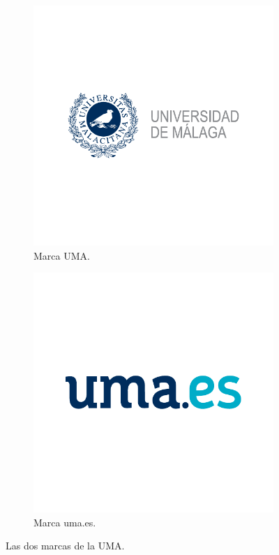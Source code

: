 	\begin{figure}[ht]
	  \centering
	  \begin{subfigure}[t]{0.4\linewidth}
	    \centering
	    \includegraphics[width=\textwidth]{figuras/MarcaUMA.pdf}
			\caption{Marca UMA.}
	    \label{fig:marcaUMA-a}
	  \end{subfigure}%
		\hfill
	  \begin{subfigure}[t]{0.4\linewidth}
	    \centering
	    \includegraphics[width=\textwidth]{figuras/marcaumaes.pdf}
	    \caption{Marca uma.es.}
	    \label{fig:marcaUMA-b}
	  \end{subfigure}
	  \caption{Las dos marcas de la UMA.}
	  \label{fig:marcaUMA}
	\end{figure}

